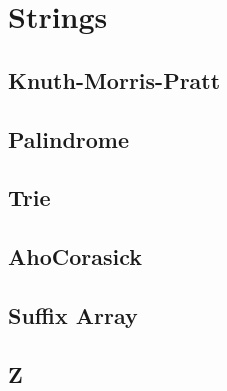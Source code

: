 
\chapter{Strings}

\section{Knuth-Morris-Pratt}
\section{Palindrome}
\section{Trie}
\section{AhoCorasick}
\section{Suffix Array}
\section{Z}
